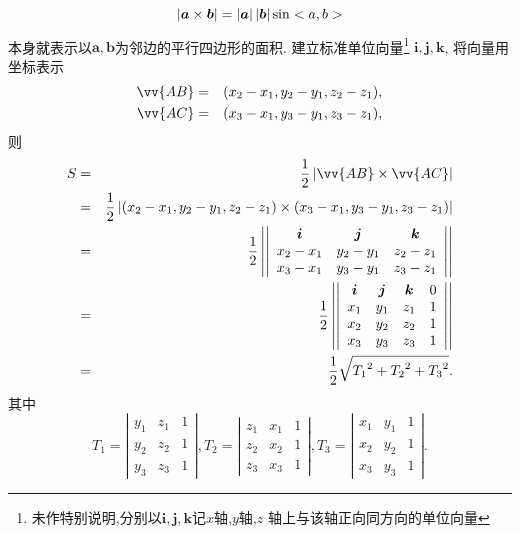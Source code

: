 $$\left| {\bm{a}\times\bm{b}} \right|=\left| {\bm{a}} \right|\left| {\bm{b}} \right|\sin<a,b>$$
本身就表示以$\bm{a},\bm{b}$为邻边的平行四边形的面积.
建立标准单位向量\footnote{
  未作特别说明,分别以$\bm{i},\bm{j},\bm{k}$记$x$轴,$y$轴,$z$
  轴上与该轴正向同方向的单位向量
  }
  $\bm{i},\bm{j},\bm{k}$, 将向量用坐标表示
\begin{eqnarray}
\vv{AB}&=&(x_2-x_1,y_2-y_1,z_2-z_1),\nonumber\\
\vv{AC}&=&(x_3-x_1,y_3-y_1,z_3-z_1),\nonumber
\end{eqnarray}
则
\begin{eqnarray}
  S&=&\frac{1}{2}\abs{\vv{AB}\times\vv{AC}}\nonumber\\
  &=&\frac{1}{2}\abs
  {(x_2-x_1,y_2-y_1,z_2-z_1)\times
  (x_3-x_1,y_3-y_1,z_3-z_1)}\nonumber\\
  &=&\frac{1}{2}\left|\left|
  \begin{array}{ccc}
    \bm{i} & \bm{j} & \bm{k} \\
    x_2-x_1 & y_2-y_1  & z_2-z_1 \\
    x_3-x_1 &y_3-y_1  & z_3-z_1 \\
  \end{array}
  \right|\right|\nonumber\\
  &=&\frac{1}{2}\left|\left|
  \begin{array}{cccc}
    \bm{i}&\bm{j}&\bm{k}&0\\
    x_1&y_1&z_1&1\\
    x_2&y_2 &z_2&1\\
    x_3&y_3&z_3&1\\
  \end{array}
  \right|\right|\nonumber\\
  &=&\frac{1}{2}\sqrt
  {
    {T_1}^2+
    {T_2}^2+
    {T_3}^2
  }\nonumber.
\end{eqnarray}
其中
$$
T_1=\left|\begin{array}{ccc}
          y_1&z_1&1\\
          y_2&z_2&1\\
          y_3&z_3&1
          \end{array}\right|,
T_2=\left|\begin{array}{ccc}
  z_1&x_1&1\\
  z_2&x_2&1\\
  z_3&x_3&1
  \end{array}\right|,
T_3=\left|\begin{array}{ccc}
  x_1&y_1&1\\
  x_2&y_2&1\\
  x_3&y_3&1
  \end{array}\right|.
$$
\solend

